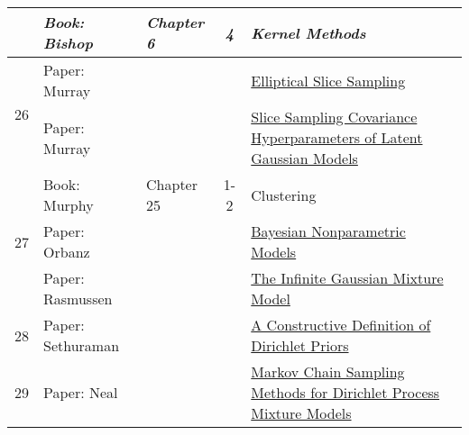 \documentclass[12pt]{article}
\begin{document}
{\begin{table}
\begin{center}
\begin{tabular}{| c | l | l | c | p{6 cm} |}
                               & \textit{Book: Bishop} & \textit{Chapter 6} & \textit{4} & \textit{Kernel Methods} \\
            \hline
            \multirow{2}{*}{26} & Paper: Murray &  &  & \href{http://homepages.inf.ed.ac.uk/imurray2/pub/10ess/ess.pdf}{Elliptical Slice Sampling} \\
                                & Paper: Murray &  &  & \href{http://homepages.inf.ed.ac.uk/imurray2/pub/10hypers/hypers.pdf}{Slice Sampling Covariance Hyperparameters of Latent Gaussian Models} \\
            \hline
            \multirow{3}{*}{27} & Book: Murphy & Chapter 25 & 1-2 & Clustering \\
                                & Paper: Orbanz &  &  & \href{http://web-static-aws.seas.harvard.edu/courses/cs281/papers/orbanz-teh-2010.pdf}{Bayesian Nonparametric Models} \\
                                & Paper: Rasmussen &  &  & \href{http://web-static-aws.seas.harvard.edu/courses/cs281/papers/rasmussen-1999a.pdf}{The Infinite Gaussian Mixture Model} \\
            \hline
            \multirow{1}{*}{28} & Paper: Sethuraman &  &  & \href{http://web-static-aws.seas.harvard.edu/courses/cs281/papers/sethuraman-1994.pdf}{A Constructive Definition of Dirichlet Priors} \\
            \hline
            \multirow{1}{*}{29} & Paper: Neal &  &  & \href{http://web-static-aws.seas.harvard.edu/courses/cs281/papers/neal-1998.pdf}{Markov Chain Sampling Methods for Dirichlet Process Mixture Models} \\
            \hline
        \end{tabular}
    \end{center}
    \end{table}

}
\end{document}
